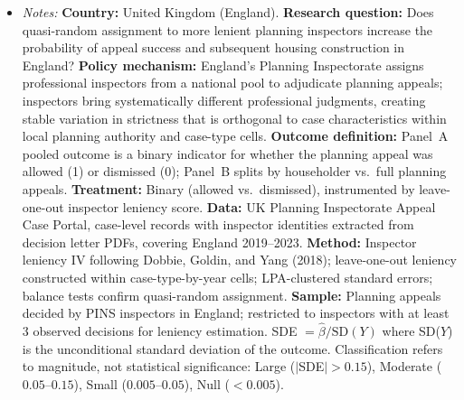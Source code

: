 \begin{table}[t]
\centering
\caption{Standardized Effect Sizes}
\label{tab:sde}
\begin{minipage}{0.95\textwidth}
\vspace{0.5em}
\begin{itemize}[leftmargin=*]
\item \textit{Notes:} \textbf{Country:} United Kingdom (England). \textbf{Research question:} Does quasi-random assignment to more lenient planning inspectors increase the probability of appeal success and subsequent housing construction in England? \textbf{Policy mechanism:} England's Planning Inspectorate assigns professional inspectors from a national pool to adjudicate planning appeals; inspectors bring systematically different professional judgments, creating stable variation in strictness that is orthogonal to case characteristics within local planning authority and case-type cells. \textbf{Outcome definition:} Panel~A pooled outcome is a binary indicator for whether the planning appeal was allowed (1) or dismissed (0); Panel~B splits by householder vs.\ full planning appeals. \textbf{Treatment:} Binary (allowed vs.\ dismissed), instrumented by leave-one-out inspector leniency score. \textbf{Data:} UK Planning Inspectorate Appeal Case Portal, case-level records with inspector identities extracted from decision letter PDFs, covering England 2019--2023. \textbf{Method:} Inspector leniency IV following Dobbie, Goldin, and Yang (2018); leave-one-out leniency constructed within case-type-by-year cells; LPA-clustered standard errors; balance tests confirm quasi-random assignment. \textbf{Sample:} Planning appeals decided by PINS inspectors in England; restricted to inspectors with at least 3 observed decisions for leniency estimation. SDE $= \hat{\beta} / \text{SD}(Y)$ where SD($Y$) is the unconditional standard deviation of the outcome. Classification refers to magnitude, not statistical significance: Large ($|$SDE$| > 0.15$), Moderate ($0.05$--$0.15$), Small ($0.005$--$0.05$), Null ($< 0.005$).
\end{itemize}
\end{minipage}
\end{table}
